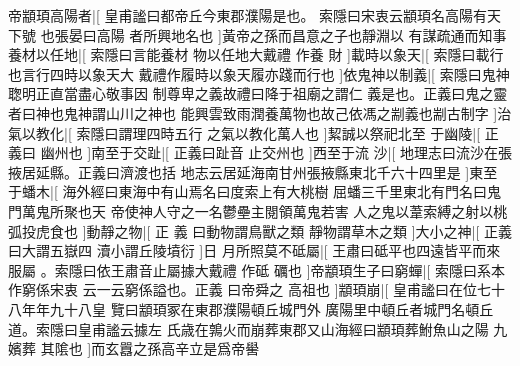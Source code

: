 帝顓頊高陽者|[%
皇甫謐曰都帝丘今東郡濮陽是也。%
索隱曰宋衷云顓頊名高陽有天下號%
%
也張晏曰高陽%
者所興地名也%
]黃帝之孫而昌意之子也靜淵以%
%
有謀疏通而知事養材以任地|[%
索隱曰言能養材%
物以任地大戴禮%
%
作養%
財%
]載時以象天|[%
索隱曰載行也言行四時以象天大%
戴禮作履時以象天履亦踐而行也%
%
]依鬼神以制義|[%
索隱曰鬼神聦明正直當盡心敬事因%
制尊卑之義故禮曰降于祖廟之謂仁%
%
義是也。正義曰鬼之靈者曰神也鬼神謂山川之神也%
能興雲致雨潤養萬物也故己依馮之剬義也剬古制字%
]治%
%
氣以教化|[%
索隱曰謂理四時五行%
之氣以教化萬人也%
]絜誠以祭祀北至%
%
于幽陵|[%
正義曰%
幽州也%
]南至于交趾|[%
正義曰趾音%
止交州也%
]西至于流%
%
沙|[%
地理志曰流沙在張掖居延縣。正義曰濟渡也括%
地志云居延海南甘州張掖縣東北千六十四里是%
]東至%
%
于蟠木|[%
海外經曰東海中有山焉名曰度索上有大桃樹%
屈蟠三千里東北有門名曰鬼門萬鬼所聚也天%
%
帝使神人守之一名鬱壘主閱領萬鬼若害%
人之鬼以葦索縛之射以桃弧投虎食也%
]動靜之物|[%
正%
義%
%
曰動物謂鳥獸之類%
靜物謂草木之類%
]大小之神|[%
正義曰大謂五嶽四%
瀆小謂丘陵墳衍%
]日%
%
月所照莫不砥屬|[%
王肅曰砥平也四遠皆平而來服屬%
。索隱曰依王肅音止屬據大戴禮%
%
作砥%
礪也%
]帝顓頊生子曰窮蟬|[%
索隱曰系本作窮係宋衷%
云一云窮係謚也。正義%
%
曰帝舜之%
高祖也%
]顓頊崩|[%
皇甫謐曰在位七十八年年九十八皇%
覽曰顓頊冢在東郡濮陽頓丘城門外%
%
廣陽里中頓丘者城門名頓丘道。索隱曰皇甫謐云據左%
氏歳在鶉火而崩葬東郡又山海經曰顓頊葬鮒魚山之陽%
%
九嬪葬%
其隂也%
]而玄囂之孫高辛立是爲帝嚳%
